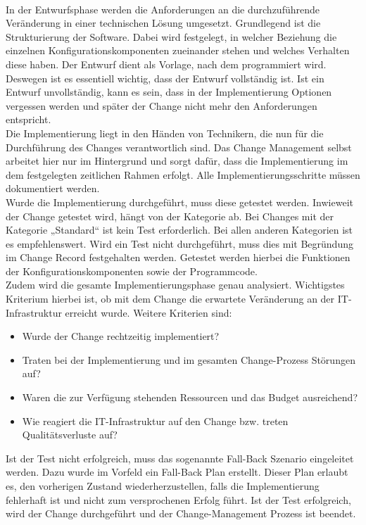 \\
In der Entwurfsphase werden die Anforderungen an die durchzuführende Veränderung in einer technischen Lösung umgesetzt. Grundlegend ist die Strukturierung der Software. Dabei wird festgelegt, in welcher Beziehung die einzelnen Konfigurationskomponenten zueinander stehen und welches Verhalten diese haben. Der Entwurf dient als Vorlage, nach dem programmiert wird. Deswegen ist es essentiell wichtig, dass der Entwurf vollständig ist. Ist ein Entwurf unvollständig, kann es sein, dass in der Implementierung Optionen vergessen werden und später der Change nicht mehr den Anforderungen entspricht. 
\\
Die Implementierung liegt in den Händen von Technikern, die nun für die Durchführung des Changes verantwortlich sind. Das Change Management selbst arbeitet hier nur im Hintergrund und sorgt dafür, dass die Implementierung im dem festgelegten zeitlichen Rahmen erfolgt. Alle Implementierungsschritte müssen dokumentiert werden. 
\\
Wurde die Implementierung durchgeführt, muss diese getestet werden. Inwieweit der Change getestet wird, hängt von der Kategorie ab. Bei Changes mit der Kategorie „Standard“ ist kein Test erforderlich. Bei allen anderen Kategorien ist es empfehlenswert. Wird ein Test nicht durchgeführt, muss dies mit Begründung im Change Record festgehalten werden. Getestet werden hierbei die Funktionen der Konfigurationskomponenten sowie der Programmcode. 
\\
Zudem wird die gesamte Implementierungsphase genau analysiert. Wichtigstes Kriterium hierbei ist, ob mit dem Change die erwartete Veränderung an der IT-Infrastruktur erreicht wurde. Weitere Kriterien sind:
\begin{itemize}
	\item 	Wurde der Change rechtzeitig implementiert?
	\item 	Traten bei der Implementierung und im gesamten Change-Prozess Störungen auf?
	\item 	Waren die zur Verfügung stehenden Ressourcen und das Budget ausreichend?
	\item Wie reagiert die IT-Infrastruktur auf den Change bzw. treten Qualitätsverluste auf?
\end{itemize}
Ist der Test nicht erfolgreich, muss das sogenannte Fall-Back Szenario eingeleitet werden. Dazu wurde im Vorfeld ein Fall-Back Plan erstellt. Dieser Plan erlaubt es, den vorherigen Zustand wiederherzustellen, falls die Implementierung fehlerhaft ist und nicht zum versprochenen Erfolg führt. Ist der Test erfolgreich, wird der Change durchgeführt und der Change-Management Prozess ist beendet.
